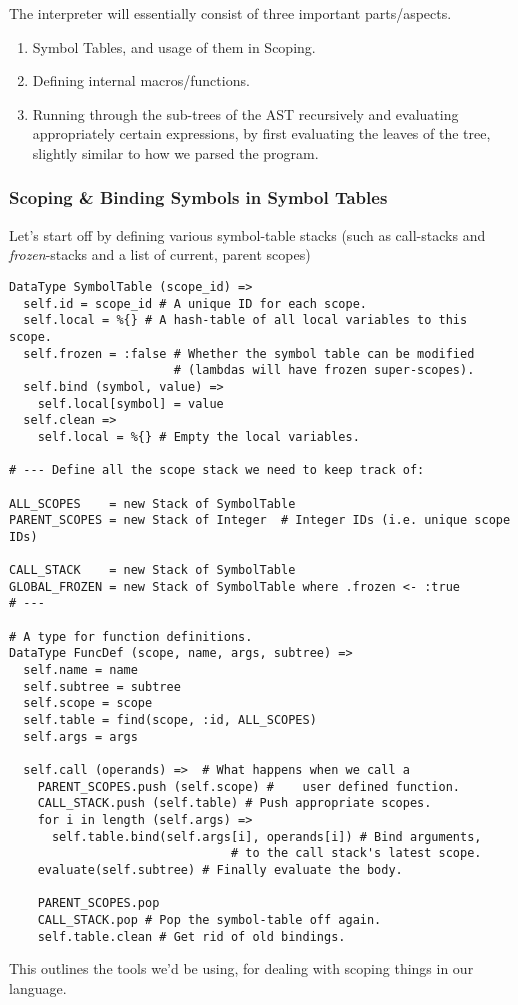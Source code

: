 \documentclass{article}
\begin{document}
    The interpreter will essentially consist of three important parts/aspects.
    \begin{enumerate}
      \item Symbol Tables, and usage of them in Scoping.
      \item Defining internal macros/functions.
      \item Running through the sub-trees of the AST recursively and evaluating
      appropriately certain expressions, by first evaluating the leaves of the
      tree, slightly similar to how we parsed the program.
    \end{enumerate}


    \clearpage

    \subsubsection{Scoping \& Binding Symbols in Symbol Tables}
    Let's start off by defining various symbol-table stacks (such as call-stacks
    and \emph{frozen}-stacks and a list of current, parent scopes)

\begin{verbatim}
DataType SymbolTable (scope_id) =>
  self.id = scope_id # A unique ID for each scope.
  self.local = %{} # A hash-table of all local variables to this scope.
  self.frozen = :false # Whether the symbol table can be modified
                       # (lambdas will have frozen super-scopes).
  self.bind (symbol, value) =>
    self.local[symbol] = value
  self.clean =>
    self.local = %{} # Empty the local variables.

# --- Define all the scope stack we need to keep track of:

ALL_SCOPES    = new Stack of SymbolTable
PARENT_SCOPES = new Stack of Integer  # Integer IDs (i.e. unique scope IDs)

CALL_STACK    = new Stack of SymbolTable
GLOBAL_FROZEN = new Stack of SymbolTable where .frozen <- :true
# ---

# A type for function definitions.
DataType FuncDef (scope, name, args, subtree) =>
  self.name = name
  self.subtree = subtree
  self.scope = scope
  self.table = find(scope, :id, ALL_SCOPES)
  self.args = args

  self.call (operands) =>  # What happens when we call a
    PARENT_SCOPES.push (self.scope) #    user defined function.
    CALL_STACK.push (self.table) # Push appropriate scopes.
    for i in length (self.args) =>
      self.table.bind(self.args[i], operands[i]) # Bind arguments,
                               # to the call stack's latest scope.
    evaluate(self.subtree) # Finally evaluate the body.

    PARENT_SCOPES.pop
    CALL_STACK.pop # Pop the symbol-table off again.
    self.table.clean # Get rid of old bindings.
\end{verbatim}
      This outlines the tools we'd be using, for dealing with scoping things in
      our language.
      \clearpage
\end{document}
